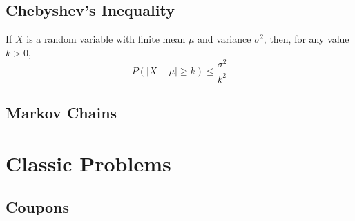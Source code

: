 \documentclass{amsproc}
\begin{document}
		\subsection{Chebyshev's Inequality} If $X$ is a random variable with finite mean $\mu$ and variance $\sigma^{2}$, then, for any value $k > 0$, \[P\left(|X - \mu| \geq k \right) \leq \frac{\sigma^{2}}{k^{2}}\]

		\subsection{Markov Chains}

	\section{Classic Problems}
		\subsection{Coupons}\
\end{document}
